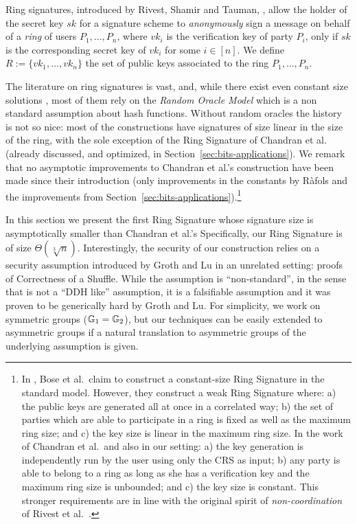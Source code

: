Ring signatures, introduced by Rivest, Shamir and Tauman, \cite{AC:RivShaTau01}, allow the holder of the secret key $sk$ for a signature scheme to \emph{anonymously} sign a message on behalf of a \emph{ring} of users $P_1,\ldots,P_n$, where $vk_i$ is the verification key of party $P_i$, only if $sk$ is the corresponding secret key of $vk_i$ for some $i\in[n]$. We define $R:=\{vk_1,\ldots,vk_n\}$ the set of public keys associated to the ring $P_1,\ldots,P_n$.

The literature on ring signatures is vast, and, while there exist even constant size solutions \cite{EC:DKNS04}, most of them rely on the \emph{Random Oracle Model} which is a non standard assumption about hash functions. Without random oracles the history is not so nice: most of the constructions have signatures of size linear in the size of the ring, with the sole exception of the Ring Signature of Chandran et al.~\cite{ICALP:ChaGroSah07} (already discussed, and optimized, in Section~\ref{sec:bits-applications}). We remark that no asymptotic improvements to Chandran et al.'s construction have been made since their introduction (only improvements in the constants by R\`afols \cite{TCC:Rafols15} and the improvements from Section~\ref{sec:bits-applications}).\footnote{In \cite{ACISP:BosDasRan15}, Bose et al.~claim to construct a constant-size Ring Signature in the standard model. However, they construct a weak Ring Signature where: a) the public keys are generated all at once in a correlated way; b) the set of parties which are able to participate in a ring is fixed as well as the maximum ring size; and c) the key size is linear in the maximum ring size. In the work of Chandran et al.~and also in our setting: a) the key generation is independently run by the user using only the CRS as input; b) any party is able to belong to a ring as long as she has a verification key and the maximum ring size is unbounded; and c) the key size is constant. This stronger requirements are in line with the original spirit of \emph{non-coordination} of  Rivest et al.~\cite{AC:RivShaTau01}.}

In this section we present the first Ring Signature whose signature size is asymptotically smaller than Chandran et al.'s Specifically, our Ring Signature is of size $\Theta(\sqrt[3]{n})$. Interestingly, the security of our construction relies on a security assumption introduced by Groth and Lu \cite{AC:GroLu07} in an unrelated setting: proofs of Correctness of a Shuffle. While the assumption is ``non-standard'', in the sense that is not a ``DDH like'' assumption, it is a falsifiable assumption and it was proven to be generically hard by Groth and Lu. For simplicity, we work on symmetric groups ($\mathbb{G}_1=\mathbb{G}_2$), but our techniques can be easily extended to asymmetric groups if a natural translation to asymmetric groups of the underlying assumption is given.

